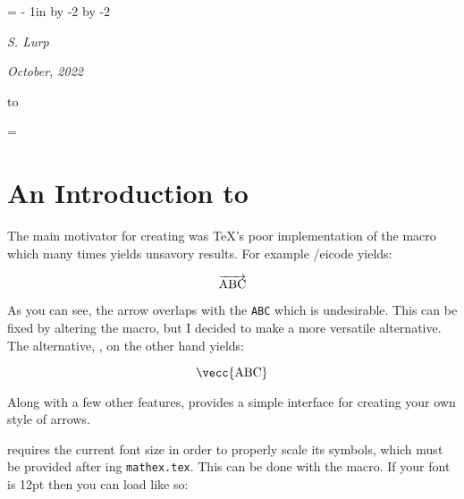 \def\showcaseaccent#1#2{{\openup3\jot\halign{\tt\hskip 1cm\string##\hfil&\quad\hfil##\cr
    \omit\tt\string#1: & \cr\noalign{\kern3pt\hrule\kern3pt}
    \displaystyle & $\displaystyle #2$\cr
    \textstyle & $\textstyle #2$\cr
    \scriptstyle & $\scriptstyle #2$\cr
    \scriptscriptstyle & $\scriptscriptstyle #2$\cr}
}}

\parindent=0pt
\parskip=3pt
\hoffset=\dimexpr 2cm - 1in \relax
\advance\hsize by -2\hoffset
{}\hoffset
\advance\vsize by -2\voffset

\nopagenumbers
\title{\MatheX}
\centerline{\it S. Lurp}
\centerline{\it October, 2022}

\bigskip
\hbox to 

\vfill\break

\footline={\hfil\folio\hfil}
\section{An Introduction to \MatheX{}}

The main motivator for creating \MatheX{} was \TeX's poor implementation of the \macroname\overrightarrow{} macro which many
times yields unsavory results.
For example \icode {}/eicode{} yields:

$$ \overrightarrow{\hbox{ABC}} $$

As you can see, the arrow overlaps with the {\tt ABC} which is undesirable.
This can be fixed by altering the \macroname\rightarrow{} macro, but I decided to make a more versatile alternative.
The \MatheX{} alternative, \macroname\vecc{}, on the other hand yields:

$$ \vecc{\hbox{ABC}} $$

Along with a few other features, \MatheX{} provides a simple interface for creating your own style of arrows.

\MatheX{} requires the current font size in order to properly scale its symbols, which must be provided after
{\tt\string}ing {\tt mathex.tex}.
This can be done with the \macroname\setscalefactor{} macro.
If your font is 12pt then you can load \MatheX{} like so:

